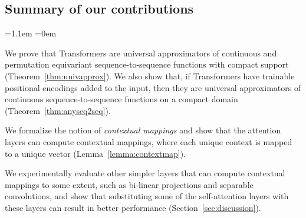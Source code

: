 
\vspace*{-5pt}
\subsection{Summary of our contributions}
\vspace*{-5pt}
\begin{list}{\textbullet}{\leftmargin=1.1em \itemindent=0em \itemsep=1pt}
    \item We prove that Transformers are universal approximators of continuous and permutation equivariant sequence-to-sequence functions with compact support (Theorem~\ref{thm:univapprox}). We also show that, if Transformers have trainable positional encodings added to the input, then they are universal approximators of continuous sequence-to-sequence functions on a compact domain (Theorem~\ref{thm:anyseq2seq}). 
    \item We formalize the notion of \emph{contextual mappings} and show that the attention layers can compute contextual mappings, where each unique context is mapped to a unique vector (Lemma~\ref{lemma:contextmap}). 
    \item We experimentally evaluate other simpler layers that can compute contextual mappings to some extent, such as bi-linear projections and separable convolutions, and show that substituting some of the self-attention layers with these layers can result in better performance (Section~\ref{sec:discussion}). %
\end{list}

